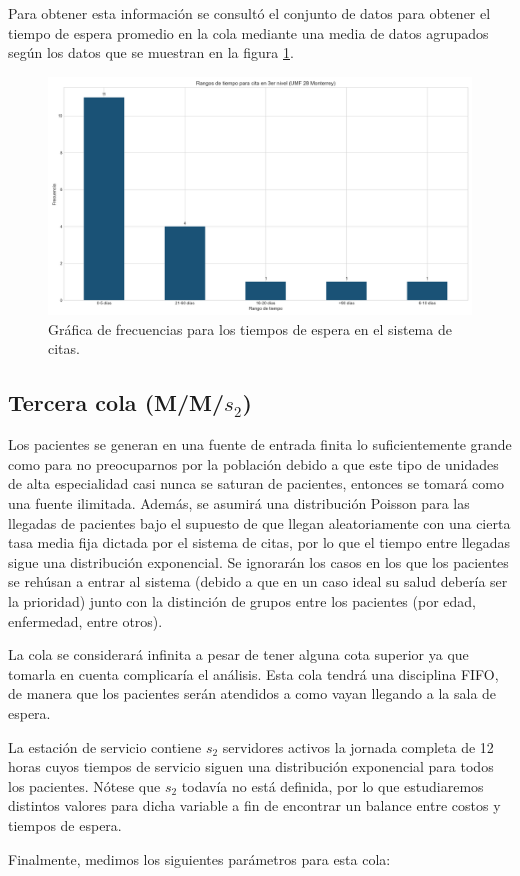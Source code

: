 \documentclass[10pt]{article}
\begin{document}
    Para obtener esta información se consultó el conjunto de datos para obtener el tiempo de espera promedio en la cola mediante una media de datos agrupados según los datos que se muestran en la figura \ref{fig:frec_espera_cita}.
    
    \begin{figure}[h]
    	\centering
    	\includegraphics[width=130mm]{./images/rangos-tiempo-3-umf28.png}
    	\caption{Gráfica de frecuencias para los tiempos de espera en el sistema de citas.}
    	\label{fig:frec_espera_cita}
    \end{figure}
    
    \subsection{Tercera cola (M/M/$s_{2}$)}
    Los pacientes se generan en una fuente de entrada finita lo suficientemente grande como para no preocuparnos por la población debido a que este tipo de unidades de alta especialidad casi nunca se saturan de pacientes, entonces se tomará como una fuente ilimitada. Además, se asumirá una distribución Poisson para las llegadas de pacientes bajo el supuesto de que llegan aleatoriamente con una cierta tasa media fija dictada por el sistema de citas, por lo que el tiempo entre llegadas sigue una distribución exponencial. Se ignorarán los casos en los que los pacientes se rehúsan a entrar al sistema (debido a que en un caso ideal su salud debería ser la prioridad) junto con la distinción de grupos entre los pacientes (por edad, enfermedad, entre otros). \par
    La cola se considerará infinita a pesar de tener alguna cota superior ya que tomarla en cuenta complicaría el análisis. Esta cola tendrá una disciplina FIFO, de manera que los pacientes serán atendidos a como vayan llegando a la sala de espera. \par
    La estación de servicio contiene $s_{2}$ servidores activos la jornada completa de 12 horas cuyos tiempos de servicio siguen una distribución exponencial para todos los pacientes. Nótese que $s_{2}$ todavía no está definida, por lo que estudiaremos distintos valores para dicha variable a fin de encontrar un balance entre costos y tiempos de espera. \par
    Finalmente, medimos los siguientes parámetros para esta cola: \par
    
\end{document}
